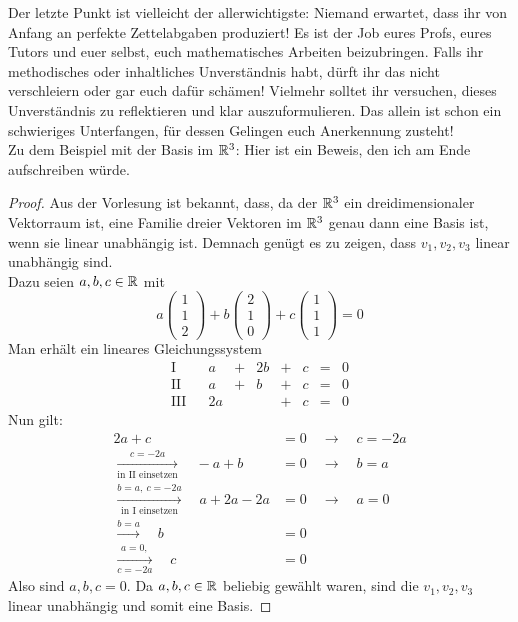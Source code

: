 \begin{phasethree}[Aufschreiben]
\begin{itemize}
    \end{itemize}
    Der letzte Punkt ist vielleicht der allerwichtigste: Niemand erwartet, dass ihr von Anfang an perfekte Zettelabgaben produziert! Es ist der Job eures Profs,  eures Tutors und euer selbst, euch mathematisches Arbeiten beizubringen. Falls ihr methodisches oder inhaltliches Unverständnis habt, dürft ihr das nicht verschleiern oder gar euch dafür schämen! Vielmehr solltet ihr versuchen, dieses Unverständnis zu reflektieren und klar auszuformulieren. Das allein ist schon ein schwieriges Unterfangen, für dessen Gelingen euch Anerkennung zusteht! \\[0.5em]
    Zu dem Beispiel mit der Basis im $\mathbb R^3$: Hier ist ein Beweis, den ich am Ende aufschreiben würde.
    \begin{proof}
        Aus der Vorlesung ist bekannt, dass, da der $\mathbb R^3$ ein dreidimensionaler Vektorraum ist, eine Familie dreier Vektoren im $\mathbb R^3$ genau dann eine Basis ist, wenn sie linear unabhängig ist. Demnach genügt es zu zeigen, dass $v_1,v_2,v_3$ linear unabhängig sind. \\[0.5em]
        Dazu seien $a,b,c\in \mathbb R$ mit
            \[ a\begin{pmatrix} 1 \\ 1 \\ 2 \end{pmatrix} + b \begin{pmatrix} 2 \\ 1 \\ 0 \end{pmatrix}+c \begin{pmatrix} 1 \\ 1 \\ 1 \end{pmatrix} = 0  \]
        Man erhält ein lineares Gleichungssystem
        \[\begin{array}{rcccccccc}
            \text{I} &&    a &+& 2b &+& c &=& 0 \\
            \text{II} && a &+& b &+& c &=& 0 \\
            \text{III} &&  2a && &+& c &=& 0
        \end{array}\]
        Nun gilt:
        \begingroup
        \allowdisplaybreaks
        \begin{align*}
            2a+c&=0 \quad \to\quad c = -2a \\
            \xrightarrow[\text{in II einsetzen}]{c=-2a}\quad -a+b &=0 \quad\to\quad b=a \\[0.5em]
            \xrightarrow[\text{in I einsetzen}]{b=a,\ c=-2a} \quad a+2a-2a &= 0 \quad\to\quad a= 0 \\
            \xrightarrow{b=a}\quad b &= 0 \\
            \xrightarrow[c=-2a]{a=0,} \quad c &= 0
        \end{align*}
        \endgroup
        Also sind $a,b,c=0$. Da $a,b,c\in \mathbb R$ beliebig gewählt waren, sind die $v_1,v_2,v_3$ linear unabhängig und somit eine Basis.
    \end{proof}
\end{phasethree}
